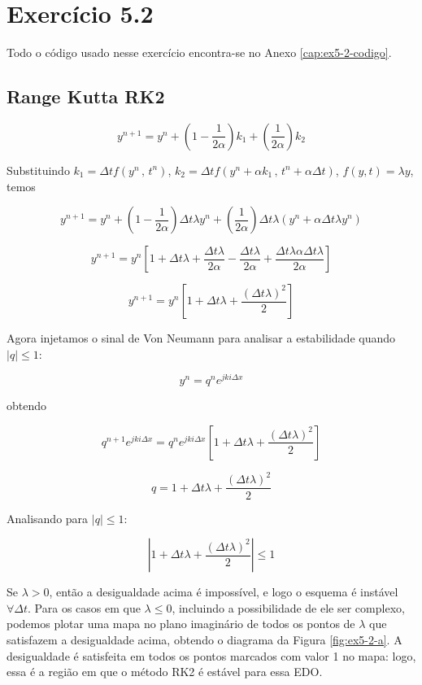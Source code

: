 \chapter{Exercício 5.2}

Todo o código usado nesse exercício encontra-se no Anexo \ref{cap:ex5-2-codigo}.

\section{Range Kutta RK2}

\[ y^{n+1} = y^{n} + \left( 1 - \frac{1}{2 \alpha} \right)k_1 + \left(\frac{1}{2 \alpha}\right)k_2 \]

Substituindo $k_1 = \Delta t f\left( y^n \, , \, t^n \right)$, 
$k_2 = \Delta t f\left( y^n + \alpha k_1 \, , \, t^n + \alpha \Delta t\right)$,
$f(y,t) = \lambda y$, temos

\[ y^{n+1} = y^{n} + \left( 1 - \frac{1}{2 \alpha} \right)\Delta t \lambda y^n
 + \left(\frac{1}{2 \alpha}\right)\Delta t \lambda ( y^n + \alpha \Delta t \lambda y^n )\]

 \[ y^{n+1} = y^n \left[ 1 + \Delta t \lambda
  + \frac{\Delta t \lambda}{2 \alpha} - \frac{\Delta t \lambda}{2 \alpha} + \frac{\Delta t \lambda \alpha \Delta t \lambda}{2 \alpha } \right]\]

 \[ y^{n+1} = y^n \left[ 1 + \Delta t \lambda + \frac{\left( \Delta t \lambda \right)^2}{2 } \right]\]

Agora injetamos o sinal de Von Neumann para analisar a estabilidade quando $\left| q \right| \leq 1$:

\[ y^n = q^n e^{j k i \Delta x} \]

\noindent obtendo

\[ q^{n+1} e^{j k i \Delta x} = q^{n} e^{j k i \Delta x} \left[ 1 + \Delta t \lambda + \frac{\left( \Delta t \lambda \right)^2}{2 } \right]\]

\[ q = 1 + \Delta t \lambda + \frac{\left( \Delta t \lambda \right)^2}{2} \]

Analisando para $\left| q \right| \leq 1$:

\[ \left|1 + \Delta t \lambda + \frac{\left( \Delta t \lambda \right)^2}{2}\right| \leq 1 \]

Se $\lambda > 0$, então a desigualdade acima é impossível, e logo o esquema é instável 
$\forall \Delta t$. Para os casos em que $\lambda \leq 0$, incluindo a possibilidade 
de ele ser complexo, podemos plotar uma mapa no plano  
imaginário de todos os pontos de $\lambda$ que satisfazem a desigualdade acima, 
obtendo o diagrama da Figura \ref{fig:ex5-2-a}. A desigualdade é satisfeita em todos os pontos
marcados com valor 1 no mapa: logo, essa é a região em que o método RK2 é estável
para essa EDO.

